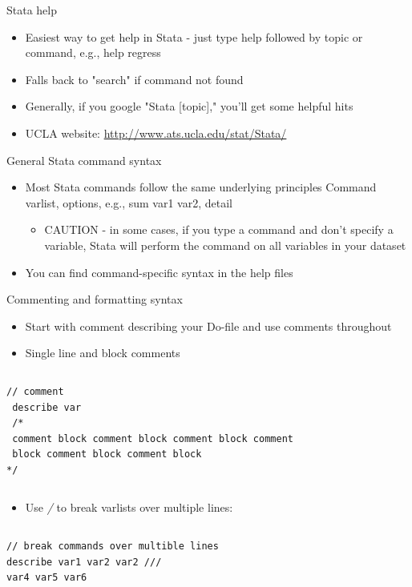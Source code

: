 \documentclass[table,smaller]{beamer}
\begin{document}
\begin{frame}[label=sec-1-6]{Stata help}
\begin{itemize}
\item Easiest way to get help in Stata - just type \alert{help} followed by topic or command, e.g., 
\alert{help regress}
\item Falls back to "search" if command not found
\item Generally, if you google "Stata [topic]," you'll get some helpful hits
\item UCLA website:
\url{http://www.ats.ucla.edu/stat/Stata/}
\end{itemize}
\end{frame}
\begin{frame}[label=sec-1-7]{General Stata command syntax}
\begin{itemize}
\item Most Stata commands follow the same underlying principles
\alert{Command varlist, options}, e.g., \alert{sum var1 var2, detail}
\begin{itemize}
\item CAUTION - in some cases, if you type a command and don't specify a variable, Stata will perform the command on all variables in your dataset
\end{itemize}
\item You can find command-specific syntax in the help files
\end{itemize}
\end{frame}
\begin{frame}[fragile,label=sec-1-8]{Commenting and formatting syntax}
 \begin{itemize}
\item Start with comment describing your Do-file and use comments throughout
\item Single line and block comments
\end{itemize}
\vspace{-.5em} \begin{columns}  \begin{block}{}
\begin{verbatim}
// comment
 describe var
 /*
 comment block comment block comment block comment
 block comment block comment block 
*/
\end{verbatim}
\end{block} \end{columns}

\begin{itemize}
\item Use \emph{/} to break varlists over multiple lines:
\end{itemize}
\vspace{-.5em} \begin{columns}  \begin{block}{}
\begin{verbatim}
// break commands over multible lines
describe var1 var2 var2 ///
var4 var5 var6
\end{verbatim}
\end{block} \end{columns}
\end{frame}
\end{document}
